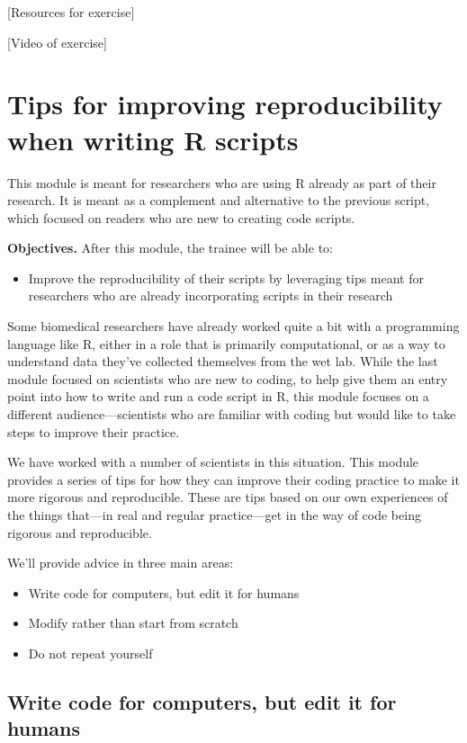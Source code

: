 \documentclass[]{tufte-book}
\providecommand{\tightlist}{%
  \setlength{\itemsep}{0pt}\setlength{\parskip}{0pt}}
\begin{document}
{[}Resources for exercise{]}

{[}Video of exercise{]}

\section{Tips for improving reproducibility when writing R scripts}\label{module13a}

This module is meant for researchers who are using R already as part of their
research. It is meant as a complement and alternative to the previous script,
which focused on readers who are new to creating code scripts.

\textbf{Objectives.} After this module, the trainee will be able to:

\begin{itemize}
\tightlist
\item
  Improve the reproducibility of their scripts by leveraging tips meant for
  researchers who are already incorporating scripts in their research
\end{itemize}

Some biomedical researchers have already worked quite a bit with a programming
language like R, either in a role that is primarily computational, or as a
way to understand data they've collected themselves from the wet lab. While
the last module focused on scientists who are new to coding, to help give them
an entry point into how to write and run a code script in R, this module
focuses on a different audience---scientists who are familiar with coding but
would like to take steps to improve their practice.

We have worked with a number of scientists in this situation. This module
provides a series of tips for how they can improve their coding practice to
make it more rigorous and reproducible. These are tips based on our own
experiences of the things that---in real and regular practice---get in the
way of code being rigorous and reproducible.

We'll provide advice in three main areas:

\begin{itemize}
\tightlist
\item
  Write code for computers, but edit it for humans
\item
  Modify rather than start from scratch
\item
  Do not repeat yourself
\end{itemize}

\subsection{Write code for computers, but edit it for humans}\label{write-code-for-computers-but-edit-it-for-humans}
\end{document}

